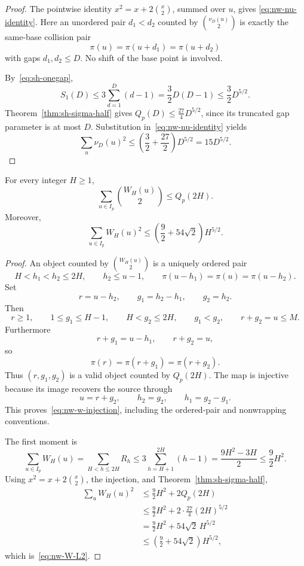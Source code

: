 \begin{proof}
The pointwise identity $x^2=x+2\binom x2$, summed over $u$, gives
\eqref{eq:nw-nu-identity}.  Here an unordered pair $d_1<d_2$ counted by
$\binom{\nu_D(u)}2$ is exactly the same-base collision pair
\[
 \pi(u)=\pi(u+d_1)=\pi(u+d_2)
\]
with gaps $d_1,d_2\le D$.  No shift of the base point is involved.

By~\eqref{eq:sh-onegap},
\[
 S_1(D)\le3\sum_{d=1}^{D}(d-1)
          =\frac32D(D-1)\le\frac32D^{5/2}.
\]
Theorem~\ref{thm:sh-sigma-half} gives
$Q_p(D)\le\frac{27}{4}D^{5/2}$, since its truncated gap parameter is at
most $D$.  Substitution in~\eqref{eq:nw-nu-identity} yields
\[
 \sum_u\nu_D(u)^2
 \le\left(\frac32+\frac{27}{2}\right)D^{5/2}
 =15D^{5/2}.
\]
\end{proof}

\begin{lemma}
\label{thm:nw-w-injection}
For every integer $H\ge1$,
\begin{equation}\label{eq:nw-w-injection}
 \sum_{u\in I_p}\binom{W_H(u)}2\le Q_p(2H).
\end{equation}
Moreover,
\begin{equation}\label{eq:nw-W-L2}
 \sum_{u\in I_p}W_H(u)^2
 \le\left(\frac92+54\sqrt2\right)H^{5/2}.
\end{equation}
\end{lemma}

\begin{proof}
An object counted by $\binom{W_H(u)}2$ is a uniquely ordered pair
\[
 H<h_1<h_2\le2H,
 \qquad h_2\le u-1,
 \qquad
 \pi(u-h_1)=\pi(u)=\pi(u-h_2).
\]
Set
\[
 r=u-h_2,
 \qquad
 g_1=h_2-h_1,
 \qquad
 g_2=h_2.
\]
Then
\[
 r\ge1,
 \qquad
 1\le g_1\le H-1,
 \qquad
 H<g_2\le2H,
 \qquad
 g_1<g_2,
 \qquad
 r+g_2=u\le M.
\]
Furthermore
\[
 r+g_1=u-h_1,
 \qquad
 r+g_2=u,
\]
so
\[
 \pi(r)=\pi(r+g_1)=\pi(r+g_2).
\]
Thus $(r,g_1,g_2)$ is a valid object counted by $Q_p(2H)$.  The map is
injective because its image recovers the source through
\[
 u=r+g_2,
 \qquad
 h_2=g_2,
 \qquad
 h_1=g_2-g_1.
\]
This proves~\eqref{eq:nw-w-injection}, including the ordered-pair and
nonwrapping conventions.

The first moment is
\[
 \sum_{u\in I_p}W_H(u)
 =\sum_{H<h\le2H}R_h
 \le3\sum_{h=H+1}^{2H}(h-1)
 =\frac{9H^2-3H}{2}
 \le\frac92H^2.
\]
Using $x^2=x+2\binom x2$, the injection, and
Theorem~\ref{thm:sh-sigma-half},
\begin{align*}
 \sum_uW_H(u)^2
 &\le \frac92H^2+2Q_p(2H)\\
 &\le \frac92H^2
      +2\cdot\frac{27}{4}(2H)^{5/2}\\
 &=\frac92H^2+54\sqrt2\,H^{5/2}\\
 &\le\left(\frac92+54\sqrt2\right)H^{5/2},
\end{align*}
which is~\eqref{eq:nw-W-L2}.
\end{proof}

